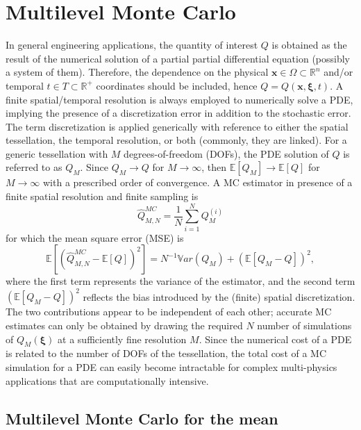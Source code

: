 \section{Multilevel Monte Carlo} \label{uq:sampling:multilevel}
In general engineering applications, the quantity of interest $Q$
is obtained as the result of the numerical solution of a partial partial differential equation (possibly a system of them).  Therefore, the dependence on the 
physical $\mathbf{x} \in \Omega\subset\mathbb{R}^n$ and/or temporal $t \in T\subset\mathbb{R^+}$ coordinates should be included, 
hence $Q=Q(\mathbf{x}, \boldsymbol{\xi}, t)$. A finite spatial/temporal resolution is always employed to numerically solve a PDE, implying
the presence of a discretization error in addition to the stochastic error. The term discretization is applied generically with reference 
to either the spatial tessellation, the temporal resolution, or both (commonly, they are linked). For a generic tessellation with $M$ 
degrees-of-freedom (DOFs), the PDE solution of $Q$ is referred to as $Q_M$. Since $Q_M \rightarrow Q$ for $M\rightarrow\infty$, 
then $\mathbb{E}\left[{Q_M}\right] \rightarrow \mathbb{E}\left[{Q}\right]$ for $M\rightarrow\infty$ with a prescribed order of convergence. 
A MC estimator in presence of a finite spatial resolution and finite sampling is
\begin{equation}
\hat{Q}^{MC}_{M,N} = \frac{1}{N} \sum_{i=1}^N Q_M^{(i)}
\end{equation}
for which the mean square error (MSE) is
\begin{equation}
\mathbb{E}\left[ (\hat{Q}^{MC}_{M,N}-\mathbb{E}\left[ Q \right] )^2 \right]
       = N^{-1} \mathbb{V}ar\left({Q_M}\right) + \left( \mathbb{E}\left[{ Q_M-Q }\right] \right)^2,
\end{equation}
where the first term represents the variance of the estimator, and the second term $\left( \mathbb{E}\left[ Q_M-Q \right] \right)^2$ reflects the bias
introduced by the (finite) spatial discretization. The two contributions appear to be independent of each other; accurate MC estimates can only be obtained by drawing the required $N$ number of simulations of $Q_M( \boldsymbol{\xi} )$ at 
a sufficiently fine resolution $M$. Since the numerical cost of a PDE is related to the number of DOFs of the tessellation,
the total cost of a MC simulation for a PDE can easily become intractable for complex multi-physics applications that are computationally 
intensive.

\subsection{Multilevel Monte Carlo for the mean}

